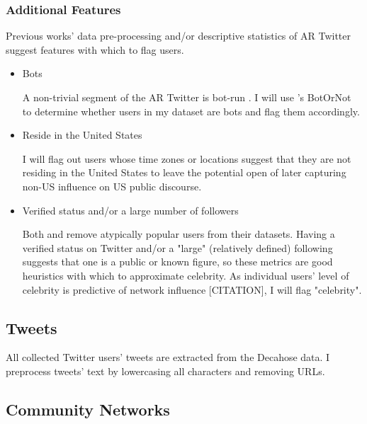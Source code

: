 \documentclass[acmlarge, screen, authorversion]{acmart}
\begin{document}
    \subsubsection{Additional Features}
    
    Previous works' \cite{bergerAltrightTwitterCensus2018, alizadehPsychologyMoralityPolitical2019} data pre-processing and/or descriptive statistics of AR Twitter suggest features with which to flag users.
    
    \begin{itemize}
        \item Bots
        
            A non-trivial segment of the AR Twitter is bot-run \cite{bergerAltrightTwitterCensus2018}. I will use \citet{davisBotOrNotSystemEvaluate2016}'s BotOrNot to determine whether users in my dataset are bots and flag them accordingly.
            
        \item Reside in the United States
        
            I will flag out users whose time zones or locations suggest that they are not residing in the United States to leave the potential open of later capturing non-US influence on US public discourse.
        
        \item Verified status and/or a large number of followers
            
            Both \citet{bergerAltrightTwitterCensus2018} and \citet{alizadehPsychologyMoralityPolitical2019} remove atypically popular users from their datasets. Having a verified status on Twitter and/or a "large" (relatively defined) following suggests that one is a public or known figure, so these metrics are good heuristics with which to approximate celebrity. As individual users' level of celebrity is predictive of network influence [CITATION], I will flag "celebrity".
        
    \end{itemize}
    
\subsection{Tweets}

    All collected Twitter users' tweets are extracted from the Decahose data. I preprocess tweets' text by lowercasing all characters and removing URLs. 
    
\subsection{Community Networks}
\end{document}
